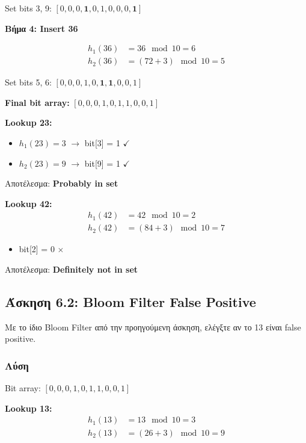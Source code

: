 Set bits 3, 9: $[0, 0, 0, \mathbf{1}, 0, 1, 0, 0, 0, \mathbf{1}]$

\textbf{Βήμα 4: Insert 36}

\begin{align*}
h_1(36) &= 36 \mod 10 = 6 \\
h_2(36) &= (72 + 3) \mod 10 = 5
\end{align*}

Set bits 5, 6: $[0, 0, 0, 1, 0, \mathbf{1}, \mathbf{1}, 0, 0, 1]$

\textbf{Final bit array:} $[0, 0, 0, 1, 0, 1, 1, 0, 0, 1]$

\textbf{Lookup 23:}
\begin{itemize}
    \item $h_1(23) = 3$ $\to$ bit[3] = 1 $\checkmark$
    \item $h_2(23) = 9$ $\to$ bit[9] = 1 $\checkmark$
\end{itemize}
Αποτέλεσμα: \textbf{Probably in set}

\textbf{Lookup 42:}
\begin{align*}
h_1(42) &= 42 \mod 10 = 2 \\
h_2(42) &= (84 + 3) \mod 10 = 7
\end{align*}
\begin{itemize}
    \item bit[2] = 0 $\times$
\end{itemize}
Αποτέλεσμα: \textbf{Definitely not in set}

\subsection{Άσκηση 6.2: Bloom Filter False Positive}

\begin{formulabox}[Εκφώνηση]
Με το ίδιο Bloom Filter από την προηγούμενη άσκηση, ελέγξτε αν το 13 είναι
false positive.
\end{formulabox}

\subsubsection*{Λύση}

Bit array: $[0, 0, 0, 1, 0, 1, 1, 0, 0, 1]$

\textbf{Lookup 13:}
\begin{align*}
h_1(13) &= 13 \mod 10 = 3 \\
h_2(13) &= (26 + 3) \mod 10 = 9
\end{align*}

